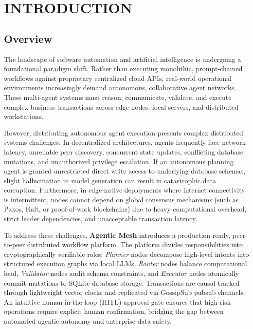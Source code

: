 \documentclass[12pt,a4paper]{report}
\begin{document}
\newpage
\tableofcontents

\newpage
\listoffigures

\newpage
\listoftables

\newpage
{}
\setcounter{page}{1}

\chapter{INTRODUCTION}

\section{Overview}
The landscape of software automation and artificial intelligence is undergoing a foundational paradigm shift. Rather than executing monolithic, prompt-chained workflows against proprietary centralized cloud APIs, real-world operational environments increasingly demand autonomous, collaborative agent networks. These multi-agent systems must reason, communicate, validate, and execute complex business transactions across edge nodes, local servers, and distributed workstations.

However, distributing autonomous agent execution presents complex distributed systems challenges. In decentralized architectures, agents frequently face network latency, unreliable peer discovery, concurrent state updates, conflicting database mutations, and unauthorized privilege escalation. If an autonomous planning agent is granted unrestricted direct write access to underlying database schemas, slight hallucination in model generation can result in catastrophic data corruption. Furthermore, in edge-native deployments where internet connectivity is intermittent, nodes cannot depend on global consensus mechanisms (such as Paxos, Raft, or proof-of-work blockchains) due to heavy computational overhead, strict leader dependencies, and unacceptable transaction latency.

To address these challenges, \textbf{Agentic Mesh} introduces a production-ready, peer-to-peer distributed workflow platform. The platform divides responsibilities into cryptographically verifiable roles: \textit{Planner} nodes decompose high-level intents into structured execution graphs via local LLMs, \textit{Router} nodes balance computational load, \textit{Validator} nodes audit schema constraints, and \textit{Executor} nodes atomically commit mutations to SQLite database storage. Transactions are causal-tracked through lightweight vector clocks and replicated via GossipSub pubsub channels. An intuitive human-in-the-loop (HITL) approval gate ensures that high-risk operations require explicit human confirmation, bridging the gap between automated agentic autonomy and enterprise data safety.
\end{document}
